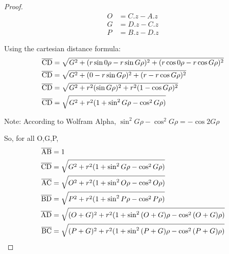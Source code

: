 \documentclass[11pt]{article}
\begin{document}
  \begin{proof}
\begin{align*}
  O  &= C.z - A.z \\
  G &= D.z - C.z \\
  P &=  B.z - D.z
\end{align*}

Using the cartesian distance formula:
\begin{align*}
  \overline{\rm CD}  &= \sqrt{G^2 + (r\sin{0 \rho} -  r\sin{G \rho})^2 + (r\cos{0 \rho} - r\cos{G \rho})^2} \\
    \overline{\rm CD}  &= \sqrt{G^2 + (0 -  r\sin{G \rho})^2 + (r - r\cos{G \rho})^2} \\
    \overline{\rm CD}  &= \sqrt{G^2 + r^2(\sin{G \rho})^2 + r^2(1 - \cos{G \rho})^2} \\
    \overline{\rm CD}  &= \sqrt{G^2 + r^2(1 + \sin^2{G \rho}  - \cos^2{G \rho})} \\    
\end{align*}

Note: According to Wolfram Alpha, $\sin^2{G \rho}  - \cos^2{G \rho} = -\cos{2 G \rho}$

So, for all O,G,P,
\begin{align*}
  \overline{\rm AB}  &= 1 \\        
  \overline{\rm CD}  &= \sqrt{G^2 + r^2(1 + \sin^2{G \rho}  - \cos^2{G \rho})} \\
  \overline{\rm AC}  &= \sqrt{O^2 + r^2(1 + \sin^2{O \rho}  - \cos^2{O \rho})} \\
  \overline{\rm BD}  &= \sqrt{P^2 + r^2(1 + \sin^2{P \rho}  - \cos^2{P \rho})} \\
  \overline{\rm AD}  &= \sqrt{(O+G)^2 + r^2(1 + \sin^2{(O +G) \rho}  - \cos^2{(O+G) \rho})} \\
  \overline{\rm BC}  &= \sqrt{(P+G)^2 + r^2(1 + \sin^2{(P +G) \rho}  - \cos^2{(P+G) \rho})} \\      
\end{align*}




\end{proof}
\end{document}

